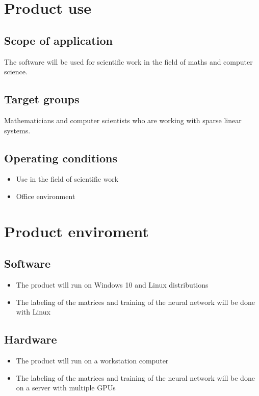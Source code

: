 \documentclass[parskip=full]{scrartcl}
\begin{document}
\section{Product use}
\subsection{Scope of application}
The software will be used for scientific work in the field of maths and computer science.
\subsection{Target groups}
Mathematicians and computer scientists who are working with sparse linear systems.
\subsection{Operating conditions}

\begin{itemize}
\item Use in the field of scientific work
\item Office environment
\end{itemize}

\section{Product enviroment}


\subsection{Software}

\begin{itemize}
\item The product will run on Windows 10 and Linux distributions 
\item The labeling of the matrices and training of the neural network will be done with Linux
\end{itemize}

\subsection{Hardware}

\begin{itemize}
\item The product will run on a workstation computer
\item The labeling of the matrices and training of the neural network will be done on a server with multiple GPUs
\end{itemize}
\end{document}
